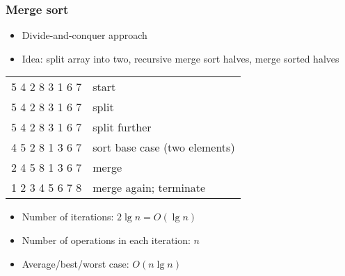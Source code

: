 \documentclass{beamer}
\begin{document}
\begin{frame}
 \frametitle{Merge sort}
 \begin{itemize}
  \item Divide-and-conquer approach
  \item Idea: split array into two, recursive merge sort halves, merge
        sorted halves
 \end{itemize}
 \begin{center}
 \begin{tabular}{cl}
  5 4 2 8 3 1 6 7 & start \pause \\
  5 4 2 8 \hspace{0.5cm}  3 1 6 7 & split \pause \\
  5 4 \hspace{0.5cm} 2 8 \hspace{0.5cm} 3 1 \hspace{0.5cm} 6 7 & split further \pause \\
  4 5 \hspace{0.5cm} 2 8 \hspace{0.5cm} 1 3 \hspace{0.5cm} 6 7 & sort base case (two elements) \pause \\
  2 4 5 8 \hspace{0.5cm} 1 3 6 7 & merge \pause \\
  1 2 3 4 5 6 7 8 & merge again; terminate \pause \\
 \end{tabular}
 \end{center}
 \begin{itemize}
  \item Number of iterations: $2 \lg n = O(\lg n)$
  \item Number of operations in each iteration: $n$
  \item Average/best/worst case: $O(n \lg n)$
 \end{itemize}
\end{frame}
\end{document}
